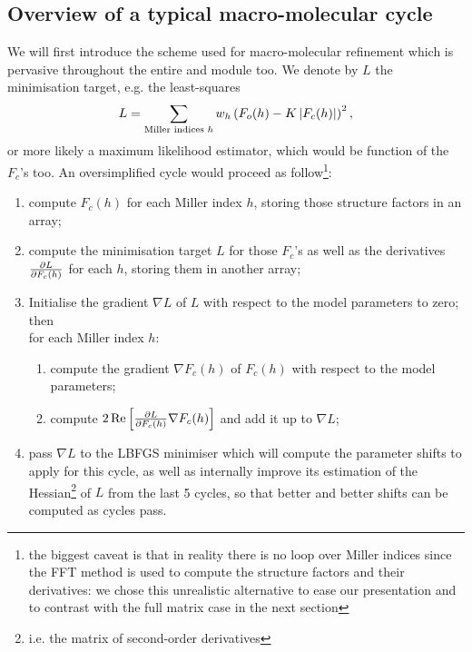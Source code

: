 \documentclass[12pt]{article}
\begin{document}
\subsection{Overview of a typical macro-molecular cycle}

We will first introduce the scheme used for macro-molecular refinement which is pervasive throughout the entire \mmtbx and \cctbx module too. We denote by $L$ the minimisation target, e.g. the least-squares
\begin{equation}
L = \sum_{\text{Miller indices $h$}} w_h \left(F_o(h) - K \left| F_c(h) \right|\right)^2,
\end{equation}
or more likely a maximum likelihood estimator, which would be function of the $F_c$'s too. An oversimplified cycle would proceed as follow\footnote{the biggest caveat is that in reality there is no loop over Miller indices since the FFT method is used to compute the structure factors and their derivatives: we chose this unrealistic alternative to ease our presentation and to contrast with the full matrix case in the next section}:
\begin{enumerate}
\item compute $F_c(h)$ for each Miller index $h$, storing those structure factors in an array;
\label{itemcomputefcalc}
\item compute the minimisation target $L$ for those $F_c$'s as well as the derivatives $\frac{\partial L}{\partial F_c(h)}$ for each $h$, storing them in another array;
\label{itemtargetlinearisation}
\item Initialise the gradient $\nabla L$ of $L$ with respect to the model parameters to zero; 
then\\ for each Miller index $h$:
\begin{enumerate}
\item compute the gradient $\nabla F_c(h)$ of $F_c(h)$ with respect to the model parameters;
\item compute $2\operatorname{Re} \left[\frac{\partial L}{\partial F_c(h)} \nabla F_c(h)\right]$ and add it up to $\nabla L$;
\end{enumerate}
\label{itemgradtarget}
\item pass $\nabla L$ to the LBFGS minimiser which will compute the parameter shifts to apply for this cycle, as well as internally improve its estimation of the Hessian\footnote{i.e. the matrix of second-order derivatives} of $L$ from the last 5 cycles, so that better and better shifts can be computed as cycles pass.
\end{enumerate}
\end{document}
